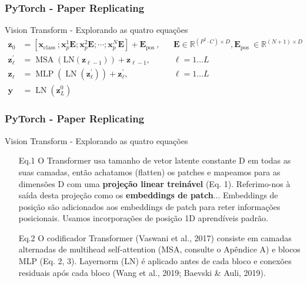 \documentclass{beamer}
\begin{document}
\begin{frame}
	\frametitle{PyTorch - Paper Replicating}
	\begin{block}{Vision Transform - Explorando as quatro equações}
		$\begin{aligned} \mathbf{z}_0 & =\left[\mathbf{x}_{\text {class }} ; \mathbf{x}_p^1 \mathbf{E} ; \mathbf{x}_p^2 \mathbf{E} ; \cdots ; \mathbf{x}_p^N \mathbf{E}\right]+\mathbf{E}_{\text {pos }}, & & \mathbf{E} \in \mathbb{R}^{\left(P^2 \cdot C\right) \times D}, \mathbf{E}_{\text {pos }} \in \mathbb{R}^{(N+1) \times D} \\ \mathbf{z}_{\ell}^{\prime} & =\operatorname{MSA}\left(\mathrm{LN}\left(\mathbf{z}_{\ell-1}\right)\right)+\mathbf{z}_{\ell-1}, & & \ell=1 \ldots L \\ \mathbf{z}_{\ell} & =\operatorname{MLP}\left(\operatorname{LN}\left(\mathbf{z}_{\ell}^{\prime}\right)\right)+\mathbf{z}_{\ell}^{\prime}, & & \ell=1 \ldots L \\ \mathbf{y} & =\operatorname{LN}\left(\mathbf{z}_L^0\right) & & \end{aligned}$
	\end{block}
\end{frame}
\begin{frame}
	\frametitle{PyTorch - Paper Replicating}
	\begin{block}{Vision Transform - Explorando as quatro equações}
		\begin{itemize}
			\item[Eq.1] O Transformer usa tamanho de vetor latente constante D em todas as suas camadas, então achatamos (flatten) os patches e mapeamos para as dimensões D com uma \textbf{projeção linear treinável} (Eq. 1). Referimo-nos à saída desta projeção como os \textbf{embeddings de patch}... Embeddings de posição são adicionados aos embeddings de patch para reter informações posicionais. Usamos incorporações de posição 1D aprendíveis padrão.
			\item[Eq.2] O codificador Transformer (Vaswani et al., 2017) consiste em camadas alternadas de multihead self-attention (MSA, consulte o Apêndice A) e blocos MLP (Eq. 2, 3). Layernorm (LN) é aplicado antes de cada bloco e conexões residuais após cada bloco (Wang et al., 2019; Baevski \& Auli, 2019).
		\end{itemize}
	\end{block}
\end{frame}
\end{document}
